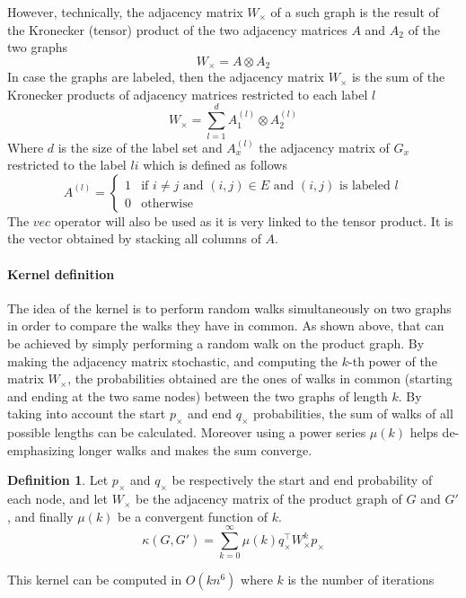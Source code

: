 \documentclass{article}
\theoremstyle{definition}
\newtheorem{definition}{Definition}
\begin{document}
However, technically, the adjacency matrix $W_{\times}$ of a such graph is the result of the Kronecker (tensor) product of the two adjacency matrices $A$ and $A_2$ of the two graphs \cite{weichsel1962kronecker}
\begin{equation}
    W_{\times}=A \otimes A_{2}
\end{equation}
In case the graphs are labeled, then the adjacency matrix $W_{\times}$ is the sum of the Kronecker products of adjacency matrices restricted to each label $l$ 
\begin{equation}
	W_{\times}=\sum\limits_{l=1}^{d} A_1^{(l)} \otimes A_2^{(l)}
\end{equation}
Where $d$ is the size of the label set and $A_x^{(l)}$ the adjacency matrix of $G_x$ restricted to the label $li$ which is defined as follows
\begin{equation}
	A^{(l)}=\left\{
		\begin{matrix}
		1 & \mbox{if } i \neq j \mbox{ and } (i,j) \in E \mbox{ and } (i,j) \mbox{ is labeled } l\\
		0 & \mbox{otherwise}
		\end{matrix}
		\right.
\end{equation}
The $vec$ operator will also be used as it is very linked to the tensor product. It is the vector obtained by stacking all columns of $A$.

\paragraph{Kernel definition}
The idea of the kernel is to perform random walks simultaneously on two graphs in order to compare the walks they have in common. As shown above, that can be achieved by simply performing a random walk on the product graph.
By making the adjacency matrix stochastic, and computing the $k$-th power of the matrix $W_\times$, the probabilities obtained are the ones of walks in common (starting and ending at the two same nodes) between the two graphs of length $k$.
By taking into account the start $p_\times$ and end $q_\times$ probabilities, the sum of walks of all possible lengths can be calculated. Moreover using a power series $\mu(k)$ helps de-emphasizing longer walks and makes the sum converge. 
\begin{definition}Let $p_{\times}$ and $q_{\times}$ be respectively the start and end probability of each node, and let $W_{\times}$ be the adjacency matrix of the product graph of $G$ and $G'$, and finally $\mu(k)$ be a convergent function of $k$.
	\begin{equation}
		\kappa(G,G') = \sum\limits_{k=0}^{\infty}\mu(k)q_{\times}^{\top}W_{\times}^{k}p_{\times}
	\end{equation}
\end{definition}
This kernel can be computed in $O(kn^6)$ where $k$ is the number of iterations 
\end{document}
